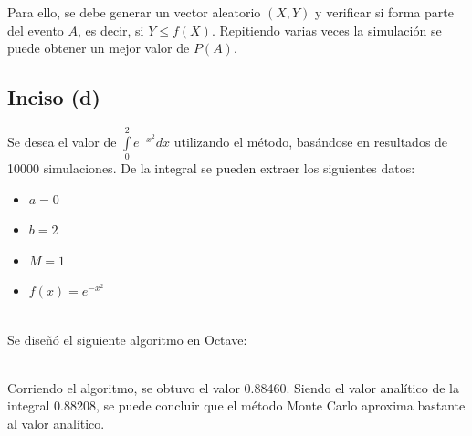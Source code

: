 \documentclass[a4paper]{article}
\begin{document}
Para ello, se debe generar un vector aleatorio $(X,Y)$ y verificar si forma
parte del evento $A$, es decir, si $Y \leqslant f(X)$. Repitiendo varias veces
la simulación se puede obtener un mejor valor de $P(A)$.

\subsection{Inciso (d)}
Se desea el valor de $\int\limits_0^2 e^{-x^2} dx$ utilizando el método,
basándose en resultados de 10000 simulaciones.
De la integral se pueden extraer los siguientes datos:

\begin{itemize}
\item $a = 0$
\item $b = 2$
\item $M = 1$
\item $f(x) = e^{-x^2}$
\end{itemize}
~\\

Se diseñó el siguiente algoritmo en Octave:


~\\

Corriendo el algoritmo, se obtuvo el valor 0.88460.
Siendo el valor analítico de la integral 0.88208, se puede concluir que el
método Monte Carlo aproxima bastante al valor analítico.
\end{document}
